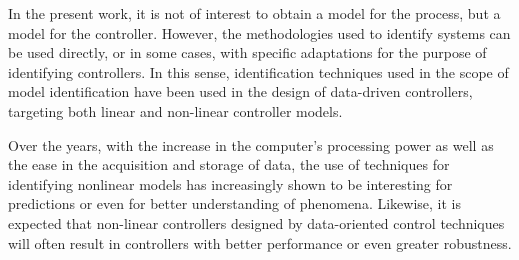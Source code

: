 In the present work, it is not of interest to obtain a model for the process, but a model for the controller. However, the methodologies used to identify systems can be used directly, or in some cases, with specific adaptations for the purpose of identifying controllers. In this sense, identification techniques used in the scope of model identification have been used in the design of data-driven controllers, targeting both linear \citep{campi2002} and non-linear \citep{campi2006} controller models.

Over the years, with the increase in the computer's processing power as well as the ease in the acquisition and storage of data, the use of techniques for identifying nonlinear models has increasingly shown to be interesting for predictions or even for better understanding of phenomena. Likewise, it is expected that non-linear controllers designed by data-oriented control techniques will often result in controllers with better performance or even greater robustness.

